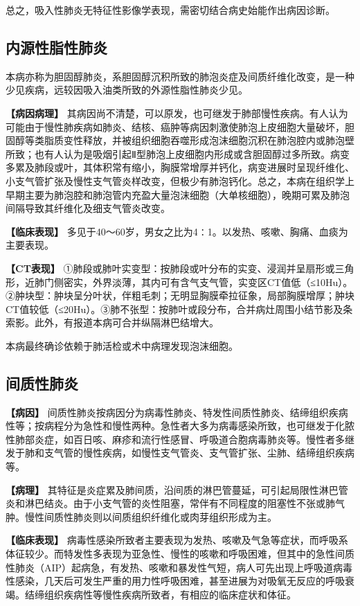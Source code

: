 总之，吸入性肺炎无特征性影像学表现，需密切结合病史始能作出病因诊断。

\subsection{内源性脂性肺炎}

本病亦称为胆固醇肺炎，系胆固醇沉积所致的肺泡炎症及间质纤维化改变，是一种少见疾病，远较因吸入油类所致的外源性脂性肺炎少见。

\textbf{【病因病理】}
其病因尚不清楚，可以原发，也可继发于肺部慢性疾病。有人认为可能由于慢性肺疾病如肺炎、结核、癌肿等病因刺激使肺泡上皮细胞大量破坏，胆固醇等类脂质变性释放，并被组织细胞吞噬形成泡沫细胞沉积在肺泡腔内或肺泡壁所致；也有人认为是吸烟引起Ⅱ型肺泡上皮细胞内形成或含胆固醇过多所致。病变多累及肺段或叶，其体积常有缩小，胸膜常增厚并钙化，病变进展时呈现纤维化、小支气管扩张及慢性支气管炎样改变，但极少有肺泡钙化。总之，本病在组织学上早期主要为肺泡腔和肺泡管内充盈大量泡沫细胞（大单核细胞），晚期可累及肺泡间隔导致其纤维化及细支气管炎改变。

\textbf{【临床表现】}
多见于40～60岁，男女之比为4∶1。以发热、咳嗽、胸痛、血痰为主要表现。

\textbf{【CT表现】}
①肺段或肺叶实变型：按肺段或叶分布的实变、浸润并呈扇形或三角形，近肺门侧密实，外界淡薄，其内可有含气支气管，实变区CT值低（≤10Hu）。②肿块型：肿块呈分叶状，伴粗毛刺；无明显胸膜牵拉征象，局部胸膜增厚；肿块CT值较低（≤20Hu）。③肺不张型：按肺叶或段分布，合并病灶周围小结节影及条索影。此外，有报道本病可合并纵隔淋巴结增大。

本病最终确诊依赖于肺活检或术中病理发现泡沫细胞。

\subsection{间质性肺炎}

\textbf{【病因】}
间质性肺炎按病因分为病毒性肺炎、特发性间质性肺炎、结缔组织疾病性等；按病程分为急性和慢性两种。急性者大多为病毒感染所致，也可继发于化脓性肺部炎症，如百日咳、麻疹和流行性感冒、呼吸道合胞病毒肺炎等。慢性者多继发于肺和支气管的慢性疾病，如慢性支气管炎、支气管扩张、尘肺、结缔组织疾病等。

\textbf{【病理】}
其特征是炎症累及肺间质，沿间质的淋巴管蔓延，可引起局限性淋巴管炎和淋巴结炎。由于小支气管的炎性阻塞，常伴有不同程度的阻塞性不张或肺气肿。慢性间质性肺炎则以间质组织纤维化或肉芽组织形成为主。

\textbf{【临床表现】}
病毒性感染所致者主要表现为发热、咳嗽及气急等症状，而呼吸系体征较少。而特发性多表现为亚急性、慢性的咳嗽和呼吸困难，但其中的急性间质性肺炎（AIP）起病急，有发热、咳嗽和暴发性气短，病人可先出现上呼吸道病毒性感染，几天后可发生严重的用力性呼吸困难，甚至进展为对吸氧无反应的呼吸衰竭。结缔组织疾病性等慢性疾病所致者，有相应的临床症状和体征。

